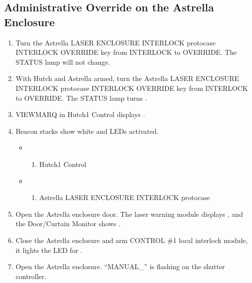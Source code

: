 \documentclass[letterpaper,10pt,english]{sphinxmanual}
\begin{document}
\subsection{Administrative Override on the Astrella Enclosure}
\label{\detokenize{testing_documentation/Hutch-1_laser:administrative-override-on-the-astrella-enclosure}}\begin{enumerate}
%
\item {} 
\sphinxAtStartPar
Turn the Astrella LASER ENCLOSURE INTERLOCK protocase INTERLOCK OVERRIDE key from INTERLOCK to OVERRIDE.
The STATUS lamp will not change.

\item {} 
\sphinxAtStartPar
With Hutch and Astrella armed, turn the Astrella LASER ENCLOSURE INTERLOCK protocase INTERLOCK OVERRIDE key from INTERLOCK to OVERRIDE.
The STATUS lamp turns .

\item {} 
\sphinxAtStartPar
VIEWMARQ in Hutch\sphinxhyphen{}1 Control displays .

\item {} 
\sphinxAtStartPar
Beacon stacks show white and  LEDs activated.
\begin{itemize}
\item {} \begin{enumerate}
%
\item {} 
\sphinxAtStartPar
Hutch\sphinxhyphen{}1 Control

\end{enumerate}

\item {} \begin{enumerate}
%
\setcounter{enumii}{1}
\item {} 
\sphinxAtStartPar
Astrella LASER ENCLOSURE INTERLOCK protocase

\end{enumerate}

\end{itemize}

\item {} 
\sphinxAtStartPar
Open the Astrella enclosure door.
The laser warning module displays , and the Door/Curtain Monitor shows .

\item {} 
\sphinxAtStartPar
Close the Astrella enclosure and arm CONTROL \#1 local interlock module, it lights the LED for .

\item {} 
\sphinxAtStartPar
Open the Astrella enclosure. “MANUAL\_” is flashing on the shutter controller.

\end{enumerate}
\end{document}
